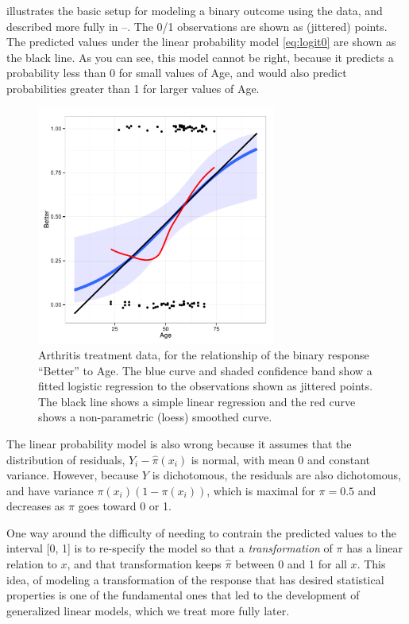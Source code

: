 \documentclass[11pt]{book}
\begin{document}
 illustrates the basic setup for modeling a binary outcome
using the  data, and described more fully in 
--.
The 0/1 observations are shown as (jittered) points. 
The predicted values under the linear probability model \eqref{eq:logit0} are shown
as the black line.  As you can see, this model cannot be right, because it predicts
a probability less than 0 for small values of Age, and would also predict
probabilities greater than 1 for larger values of Age.

\begin{figure}[!htb]
\centering
\includegraphics[width=0.7\textwidth]{ch07/fig/arthritis-age}
\caption{Arthritis treatment data, for the relationship of the binary response ``Better'' to Age. The blue curve and shaded confidence band show a fitted logistic regression to the observations shown as jittered points. The black line shows a simple linear regression and the red curve shows a non-parametric (loess) smoothed curve.}
\label{fig:arthritis-age}
\end{figure}

The linear probability model is also wrong because it assumes that the distribution
of residuals, $Y_i - \hat{\pi} (x_i)$ is normal, with mean 0 and constant variance.
However, because $Y$ is dichotomous, the residuals are also dichotomous, and have
variance $\pi (x_i) (1 - \pi (x_i))$, which is maximal for $\pi = 0.5$ and decreases
as $\pi$ goes toward 0 or 1.

One way around the difficulty of needing to contrain the predicted values to
the interval [0, 1]
is to re-specify the model so that a
\emph{transformation} of $\pi$ has a linear relation to $x$, and that transformation
keeps $\hat{\pi}$ between 0 and 1 for all $x$. This idea, of modeling a
transformation of the response that has desired statistical properties is one of
the fundamental ones that led to the development of generalized linear models,
which we treat more fully later.
\end{document}
